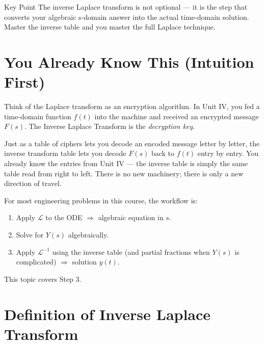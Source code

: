 \documentclass[12pt,a4paper]{article}
\begin{document}
\begin{learnbox}{Key Point}
The inverse Laplace transform is not optional --- it is the step that
converts your algebraic s-domain answer into the actual time-domain solution.
Master the inverse table and you master the full Laplace technique.
\end{learnbox}

\section{You Already Know This (Intuition First)}

Think of the Laplace transform as an encryption algorithm. In Unit IV,
you fed a time-domain function $f(t)$ into the machine and received an
encrypted message $F(s)$. The Inverse Laplace Transform is the
\emph{decryption key}.

Just as a table of ciphers lets you decode an encoded message letter by
letter, the inverse transform table lets you decode $F(s)$ back to $f(t)$
entry by entry. You already know the entries from Unit IV --- the inverse table
is simply the same table read from right to left. There is no new machinery;
there is only a new direction of travel.

For most engineering problems in this course, the workflow is:
\begin{enumerate}
  \item Apply $\mathcal{L}$ to the ODE $\Rightarrow$ algebraic equation in $s$.
  \item Solve for $Y(s)$ algebraically.
  \item Apply $\mathcal{L}^{-1}$ using the inverse table (and partial fractions
        when $Y(s)$ is complicated) $\Rightarrow$ solution $y(t)$.
\end{enumerate}
This topic covers Step 3.

\section{Definition of Inverse Laplace Transform}
\end{document}

